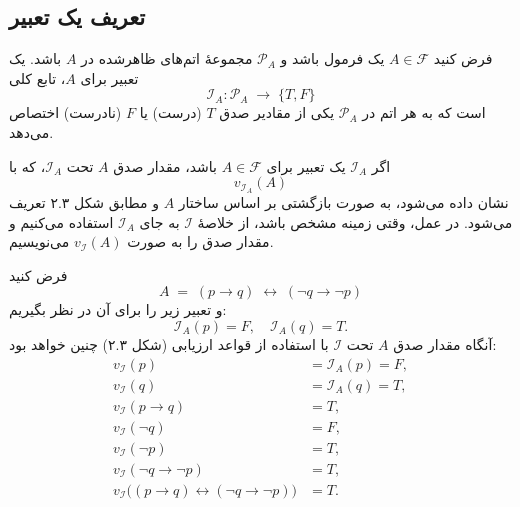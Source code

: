 \subsection*{ تعریف یک تعبیر}
  \begin{definition}[تعریف \lr{2.15}]
    فرض کنید $A\in \mathscr{F}$ یک فرمول باشد و $\mathscr{P}_{A}$ مجموعهٔ اتم‌های ظاهرشده در $A$ باشد.  
    یک تعبیر برای $A$، تابع کلی  
    \[
    \mathscr{I}_{A} : \mathscr{P}_{A} \;\longrightarrow\; \{T, F\}
    \]
    است که به هر اتم در $\mathscr{P}_{A}$ یکی از مقادیر صدق $T$ (درست) یا $F$ (نادرست) اختصاص می‌دهد.
  \end{definition}
  \begin{definition}[تعریف \lr{2.16}]
    اگر $\mathscr{I}_{A}$ یک تعبیر برای $A\in \mathscr{F}$ باشد، مقدار صدق $A$ تحت $\mathscr{I}_{A}$، که با
    \[
    v_{\mathscr{I}_{A}}(A)
    \]
    نشان داده می‌شود، به صورت بازگشتی بر اساس ساختار $A$ و مطابق شکل ۲.۳ تعریف می‌شود.
    در عمل، وقتی زمینه مشخص باشد، از خلاصهٔ $\mathscr{I}$ به جای $\mathscr{I}_{A}$ استفاده می‌کنیم و مقدار صدق را به صورت $v_{\mathscr{I}}(A)$ می‌نویسیم.
  \end{definition}
  \begin{example}[مثال \lr{2.17}]
    فرض کنید
    \[
    A \;=\; (p \rightarrow q) \;\leftrightarrow\; (\neg q \rightarrow \neg p)
    \]
    و تعبیر زیر را برای آن در نظر بگیریم:
    \[
    \mathscr{I}_{A}(p)=F,\quad \mathscr{I}_{A}(q)=T.
    \]
    آنگاه مقدار صدق $A$ تحت $\mathscr{I}$ با استفاده از قواعد ارزیابی (شکل ۲.۳) چنین خواهد بود:
    \begin{align*}
    v_{\mathscr{I}}(p) &= \mathscr{I}_{A}(p) = F,\\
    v_{\mathscr{I}}(q) &= \mathscr{I}_{A}(q) = T,\\
    v_{\mathscr{I}}(p\rightarrow q) &= T,\\
    v_{\mathscr{I}}(\neg q) &= F,\\
    v_{\mathscr{I}}(\neg p) &= T,\\
    v_{\mathscr{I}}(\neg q \rightarrow \neg p) &= T,\\
    v_{\mathscr{I}}\bigl((p\rightarrow q)\leftrightarrow(\neg q\rightarrow \neg p)\bigr) &= T.
    \end{align*}
  \end{example}
